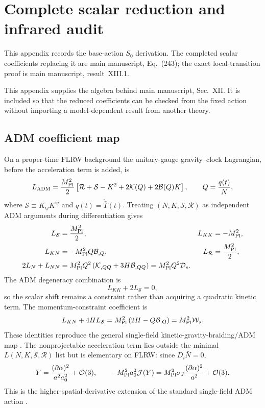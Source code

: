 \documentclass[aps,prd,reprint,onecolumn,notitlepage,nofootinbib,longbibliography,floatfix]{revtex4-2}
\theoremstyle{scstyle}
\theoremstyle{definition}
\theoremstyle{remark}
\newcommand{\mpl}{M_{\rm Pl}}
\newcommand{\cK}{\mathcal K}
\newcommand{\cB}{\mathcal B}
\newcommand{\cJ}{\mathcal J}
\newcommand{\cD}{\mathcal D}
\newcommand{\cO}{\mathcal O}
\begin{document}
\section{Complete scalar reduction and infrared audit}
\label{app:scalarfull}

This appendix records the base-action $S_0$ derivation. The completed scalar coefficients replacing it are main manuscript, Eq.~(243); the exact local-transition proof is main manuscript, result~XIII.1.

This appendix supplies the algebra behind main manuscript, Sec.~XII. It is included so that the reduced coefficients can be checked from the fixed action without importing a model-dependent result from another theory.

\subsection{ADM coefficient map}

On a proper-time FLRW background the unitary-gauge gravity--clock Lagrangian, before the acceleration term is added, is
\begin{equation}
L_{\rm ADM}
=\frac{\mpl^2}{2}
\left[\mathcal R+\mathcal S-K^2+2\cK(Q)+2\cB(Q)K\right],
\qquad
Q=\frac{q(t)}{N},
\label{eq:scalarADMmap}
\end{equation}
where $\mathcal S\equiv K_{ij}K^{ij}$ and $q(t)=\dot{\bar T}(t)$. Treating $(N,K,\mathcal S,\mathcal R)$ as independent ADM arguments during differentiation gives
\begin{align}
L_{\mathcal S}&=\frac{\mpl^2}{2},
&L_{KK}&=-\mpl^2,
\nonumber\\
L_{K N}&=-\mpl^2Q\cB_{,Q},
&L_{\mathcal R}&=\frac{\mpl^2}{2},
\label{eq:EFTderivatives1}\\
2L_N+L_{NN}
&=\mpl^2Q^2\left(\cK_{,QQ}+3H\cB_{,QQ}\right)
=\mpl^2Q^2\cD_s.
\label{eq:EFTderivatives2}
\end{align}
The ADM degeneracy combination is
\begin{equation}
L_{KK}+2L_{\mathcal S}=0,
\label{eq:ADMdegeneracyquadratic}
\end{equation}
so the scalar shift remains a constraint rather than acquiring a quadratic kinetic term. The momentum-constraint coefficient is
\begin{equation}
L_{KN}+4HL_{\mathcal S}
=\mpl^2\left(2H-Q\cB_{,Q}\right)
=\mpl^2\mathcal W_s.
\label{eq:EFTWmap}
\end{equation}
These identities reproduce the general single-field kinetic-gravity-braiding/ADM map \cite{Kobayashi2011,Tsujikawa2015}. The nonprojectable acceleration term lies outside the minimal $L(N,K,\mathcal S,\mathcal R)$ list but is elementary on FLRW: since $D_i\bar N=0$,
\begin{equation}
Y=\frac{(\partial\alpha)^2}{a^2a_0^2}+\cO(3),
\qquad
-\mpl^2a_0^2\cJ(Y)
=\mpl^2\sigma_J\frac{(\partial\alpha)^2}{a^2}+\cO(3).
\label{eq:JquadraticFLRW}
\end{equation}
This is the higher-spatial-derivative extension of the standard single-field ADM action \cite{Tsujikawa2015}.
\end{document}
